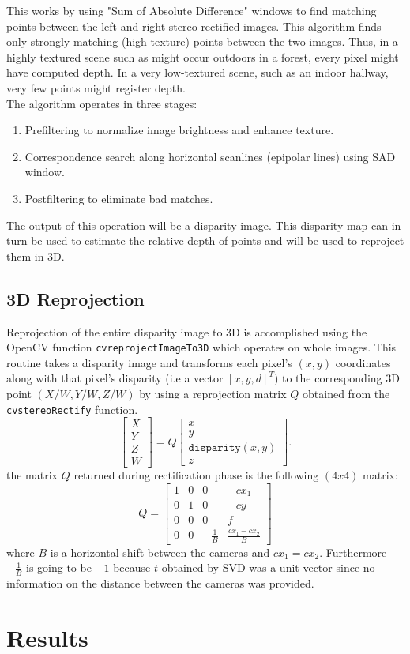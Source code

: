 \documentclass[12pt]{amsart}
\begin{document}
This works by using "Sum of Absolute Difference" windows to find matching points between the left and right stereo-rectified images. 
This algorithm finds only strongly matching (high-texture) points between the two images. Thus, in a highly textured scene such as might occur outdoors in a forest, every pixel might have computed depth. 
In a very low-textured scene, such as an indoor hallway, very few points might register depth.\\
The algorithm operates in three stages:
\begin{enumerate}[label={\arabic*.}]
    \item Prefiltering to normalize image brightness and enhance texture.
    \item Correspondence search along horizontal scanlines (epipolar lines) using SAD window.
    \item Postfiltering to eliminate bad matches.
\end{enumerate}
The output of this operation will be a disparity image. 
This disparity map can in turn be used to estimate the relative depth of points and will be used to reproject them in 3D.
\subsection{3D Reprojection}
Reprojection of the entire disparity image to 3D is accomplished using the OpenCV function \texttt{cvreprojectImageTo3D} which operates on whole images.
This routine takes a disparity image and transforms each pixel's \((x, y)\) coordinates along with that pixel's disparity (i.e a vector \([x, y, d]^T\)) 
to the corresponding 3D point \((X/W, Y/W, Z/W)\) by using a reprojection matrix \(Q\) obtained from the \texttt{cvstereoRectify} function.
\begin{equation*}
    \begin{bmatrix} X \\ Y \\ Z \\ W \end{bmatrix} = Q \begin{bmatrix} x \\ y \\ \texttt{disparity} (x,y) \\ z \end{bmatrix}.
\end{equation*}
the matrix \(Q\) returned during rectification phase is the following \((4x4)\) matrix:
\begin{equation*}
    Q = \begin{bmatrix} 1 & 0 & 0 & -cx_1 \\ 0 & 1 & 0 & -cy \\ 0 & 0 & 0 & f \\ 0 & 0 & -\frac{1}{B} & \frac{cx_1 - cx_2}{B} \end{bmatrix}
\end{equation*}
where \(B\) is a horizontal shift between the cameras and $cx_1=cx_2$.
Furthermore \(-\frac{1}{B}\) is going to be \(-1\) because \(t\) obtained by SVD was a unit vector since no information on the distance between the cameras was provided.
\section*{Results}
\printbibliography
\end{document}
